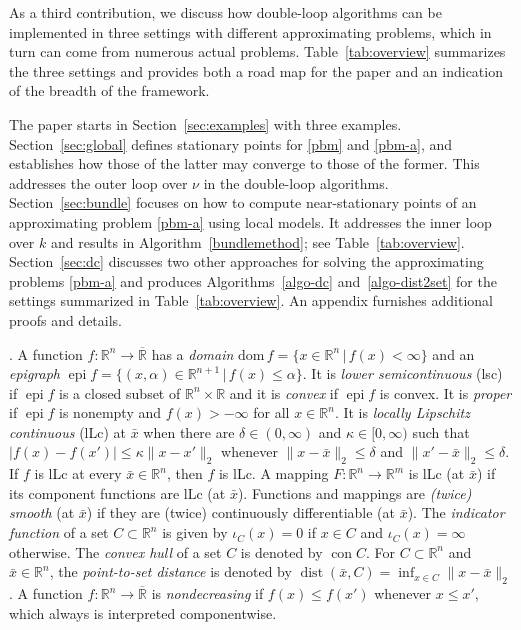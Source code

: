 \documentclass[smallextended,envcountsect]{svjour3}
\newcommand{\dom}[1]{\mathrm{dom}\, #1} %
\newcommand{\epi}[1]{\operatorname{epi}#1}
\newcommand{\reals}{\mathbb{R}}
\newcommand{\Reals}{\overline{\mathbb{R}}}
\DeclareMathOperator{\con}{con}
\DeclareMathOperator{\dist}{dist}
\begin{document}
As a third contribution, we discuss how double-loop algorithms can be implemented in three settings with different approximating problems, which in turn can come from numerous actual problems. Table~\ref{tab:overview} summarizes the three settings and provides both a road map for the paper and an indication of the breadth of the framework.   

The paper starts in Section~\ref{sec:examples} with three examples. Section~\ref{sec:global} defines stationary points for \eqref{pbm} and \eqref{pbm-a}, and establishes how those of the latter may converge to those of the former. This addresses the outer loop over $\nu$ in the double-loop algorithms. Section~\ref{sec:bundle} focuses on how to compute near-stationary points of an approximating problem \eqref{pbm-a} using local models. It addresses the inner loop over $k$ and results in Algorithm~\ref{bundlemethod}; see Table~\ref{tab:overview}.  Section~\ref{sec:dc} discusses two other approaches for solving the approximating problems \eqref{pbm-a} and produces Algorithms~\ref{algo-dc} and~\ref{algo-dist2set} for the settings summarized in Table~\ref{tab:overview}. An appendix furnishes additional proofs and details.

\medskip

. A function $f:\reals^n\to \Reals$ has a {\em domain} $\dom f = \{x\in \reals^n\,|\,f(x)<\infty\}$ and an {\em epigraph} $\epi f = \{(x,\alpha)\in \reals^{n+1}\,|\,f(x)\leq \alpha\}$. It is {\em lower semicontinuous} (lsc) if $\epi f$ is a closed subset of $\reals^n\times\reals$ and it is {\em convex} if $\epi f$ is convex. It is {\em proper} if $\epi f$ is nonempty and $f(x)>-\infty$ for all $x\in \reals^n$. It is {\it locally Lipschitz continuous} (lLc) at $\bar x$ when there are $\delta \in (0,\infty)$ and $\kappa \in [0,\infty)$ such that $|f(x) - f(x')| \leq \kappa\|x-x'\|_2$ whenever $\|x-\bar x\|_2\leq \delta$ and $\|x'-\bar x\|_2\leq \delta$. If $f$ is lLc at every $\bar x\in\reals^n$, then $f$ is lLc. A mapping $F:\reals^n\to \reals^m$ is lLc (at $\bar x$) if its component functions are lLc (at $\bar x$). Functions and mappings are  {\em (twice) smooth} (at $\bar x$) if they are (twice) continuously differentiable (at $\bar x$). The {\em indicator function} of a set $C\subset\reals^n$ is given by $\iota_C(x) = 0$ if $x\in C$ and $\iota_C(x) = \infty$ otherwise. The {\em convex hull} of a set $C$ is denoted by $\con C$. For $C\subset\reals^n$ and $\bar x\in \reals^n$, the {\em point-to-set distance} is denoted by $\dist(\bar x, C)= \inf_{x\in C} \|x-\bar x\|_2$. A function $f:\reals^n\to \Reals$ is {\em nondecreasing} if $f(x)\leq f(x')$ whenever $x\leq x'$, which always is interpreted componentwise.
\end{document}
